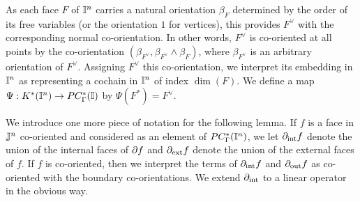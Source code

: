 As each face $F$ of $\mathbb{I}^n$ carries a natural orientation $\beta_F$ determined by the order of its free variables (or the orientation $1$ for vertices), this provides $F^\vee$ with the corresponding normal co-orientation. In other words, $F^\vee$ is co-oriented at all points by the co-orientation $(\beta_{F^\vee},\beta_{F^\vee} \wedge \beta_F)$, where $\beta_{F^\vee}$ is an arbitrary orientation of $F^\vee$. Assigning $F^\vee$ this co-orientation, we interpret its embedding in $\mathbb{I}^n$ as representing a cochain in $\mathbb{I}^n$ of index $\dim(F)$.
We define a map $\Psi: K^*(\mathbb{I}^n) \to PC_\Gamma^*(\mathbb{I})$ by $\Psi(F^*) = F^\vee$.

We introduce one more piece of notation for the following lemma. If $f$ is a face in $\mathbb{J}^n$ co-oriented and considered as an element of $PC^*_\Gamma(\mathbb{I}^n)$, we let $\partial_{\text{int}}f$ denote the union of the internal faces of $\partial f$ and $\partial_{\text{ext}}f$ denote the union of the external faces of $f$. If $f$ is co-oriented, then we interpret the terms of $\partial_{\text{int}}f$ and $\partial_{\text{out}}f$ as co-oriented with the boundary co-orientations. We extend $\partial_{\text{int}}$ to a linear operator in the obvious way.

